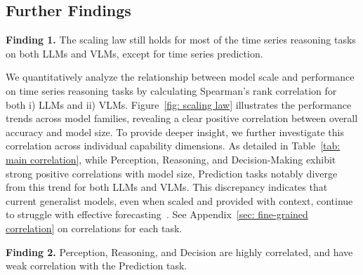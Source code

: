 \documentclass{article}
\theoremstyle{plain}
\theoremstyle{definition}
\theoremstyle{remark}
\theoremstyle{plain}
\begin{document}
\begin{table}[t]
\caption{Spearman's rank correlation ($\rho$) between LLM and VLM performances and model size on main dimensions. "(*)" marks correlations with p-values $\leq$ 0.05.}
\label{tab: main correlation}
\centering
{}
\end{table}
\subsection{Further Findings}
\begin{tcolorbox}
\textbf{Finding 1.} The scaling law still holds for most of the time series reasoning tasks on both LLMs and VLMs, except for time series prediction.
\end{tcolorbox}

We quantitatively analyze the relationship between model scale and performance on time series reasoning tasks by calculating Spearman's rank correlation for both i) LLMs and ii) VLMs. Figure~\ref{fig: scaling law} illustrates the performance trends across model families, revealing a clear positive correlation between overall accuracy and model size. To provide deeper insight, we further investigate this correlation across individual capability dimensions. As detailed in Table~\ref{tab: main correlation}, while Perception, Reasoning, and Decision-Making exhibit strong positive correlations with model size, Prediction tasks notably diverge from this trend for both LLMs and VLMs. This discrepancy indicates that current generalist models, even when scaled and provided with context, continue to struggle with effective forecasting~\citep{tan2024language}. See Appendix~\ref{sec: fine-grained correlation} on correlations for each task.



\begin{tcolorbox}
    \textbf{Finding 2.} Perception, Reasoning, and Decision are highly correlated, and have weak correlation with the Prediction task.
\end{tcolorbox}
\end{document}
